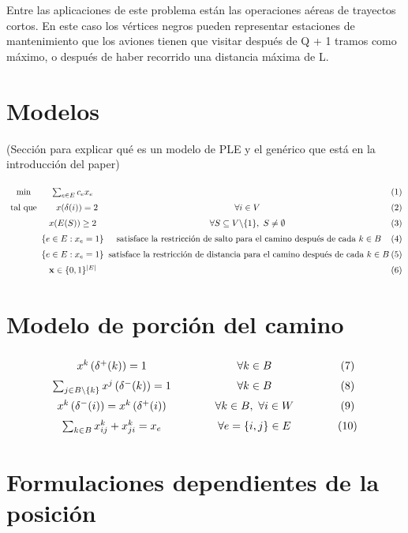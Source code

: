 \documentclass[10pt, a4paper]{article}
\begin{document}
Entre las aplicaciones de este problema están las operaciones aéreas de trayectos cortos. En este caso los vértices negros pueden representar estaciones de mantenimiento que los aviones tienen que visitar después de Q + 1 tramos como máximo, o después de haber recorrido una distancia máxima de L.

\section{Modelos}

(Sección para explicar qué es un modelo de PLE y el genérico que está en la introducción del paper)

\[
\arraycolsep=1pt\def\arraystretch{1.5}
\begin{array}{cccc}
	\min & \sum_{e \in E} c_{e} x_{e} & & (1) \\
	\text { tal que } & \quad x(\delta(i))=2 & \forall i \in V & (2) \\
	& x(E(S)) \geq 2 & \forall S \subseteq V \backslash\{1\},\ S \neq \emptyset & (3) \\
	& \left\{e \in E : x_{e}=1\right\} & \text { satisface la restricción de salto para el camino después de cada } k \in B & (4) \\
	& \left\{e \in E : x_{e}=1\right\} & \text { satisface la restricción de distancia para el camino después de cada } k \in B & (5) \\
	& \mathbf{x} \in\{0,1\}^{|E|} & & (6) 
\end{array}
\]

\section{Modelo de porción del camino}

\[
\arraycolsep=20pt\def\arraystretch{1.5}
\begin{array}{ccc}
	x^{k}\left(\delta^{+}(k)\right)=1 & \forall k \in B & (7) \\
	\sum_{j \in B \backslash\{k\}} x^{j}\left(\delta^{-}(k)\right)=1 & \forall k \in B & (8) \\
	x^{k}\left(\delta^{-}(i)\right)=x^{k}\left(\delta^{+}(i)\right) & \forall k \in B,\ \forall i \in W & (9) \\
	\sum_{k \in B} x_{i j}^{k}+x_{j i}^{k}=x_{e} & \forall e=\{i, j\} \in E & (10)
\end{array}
\]

\section{Formulaciones dependientes de la posición}
\end{document}
